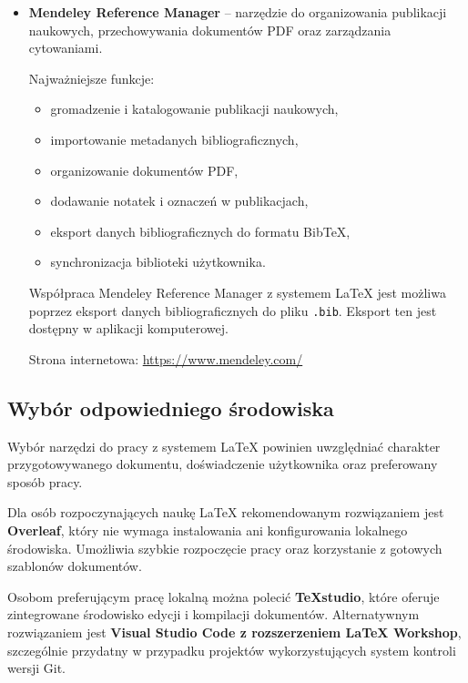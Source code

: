 \begin{itemize}
    Strona internetowa: \url{https://www.jabref.org/}

    \item \textbf{Mendeley Reference Manager} -- narzędzie do organizowania publikacji naukowych, przechowywania dokumentów PDF oraz zarządzania cytowaniami.

    Najważniejsze funkcje:
    \begin{itemize}
        \item gromadzenie i katalogowanie publikacji naukowych,
        \item importowanie metadanych bibliograficznych,
        \item organizowanie dokumentów PDF,
        \item dodawanie notatek i oznaczeń w publikacjach,
        \item eksport danych bibliograficznych do formatu BibTeX,
        \item synchronizacja biblioteki użytkownika.
    \end{itemize}

    Współpraca Mendeley Reference Manager z systemem \LaTeX{} jest możliwa poprzez eksport danych bibliograficznych do pliku \texttt{.bib}. Eksport ten jest dostępny w aplikacji komputerowej.

    Strona internetowa: \url{https://www.mendeley.com/}

\end{itemize}


\subsection{Wybór odpowiedniego środowiska}

Wybór narzędzi do pracy z systemem \LaTeX{} powinien uwzględniać charakter przygotowywanego dokumentu, doświadczenie użytkownika oraz preferowany sposób pracy.

Dla osób rozpoczynających naukę \LaTeX{} rekomendowanym rozwiązaniem jest \textbf{Overleaf}, który nie wymaga instalowania ani konfigurowania lokalnego środowiska. Umożliwia szybkie rozpoczęcie pracy oraz korzystanie z gotowych szablonów dokumentów.

Osobom preferującym pracę lokalną można polecić \textbf{TeXstudio}, które oferuje zintegrowane środowisko edycji i kompilacji dokumentów. Alternatywnym rozwiązaniem jest \textbf{Visual Studio Code z rozszerzeniem LaTeX Workshop}, szczególnie przydatny w przypadku projektów wykorzystujących system kontroli wersji Git.

